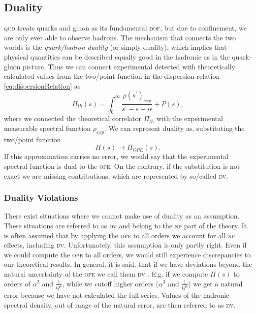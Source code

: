 \documentclass[../../index.tex]{subfiles}
\begin{document}
\subsection{Duality}
\label{sec:duality}
\textsc{qcd} treats quarks and gluon as its fundamental \textsc{dof}, but due to
confinement, we are only ever able to observe hadrons. The mechanism that
connects the two worlds is the \textit{quark\-/hadron duality} (or simply
duality), which implies that physical quantities can be described equally good
in the hadronic as in the quark-gluon picture. Thus we can connect experimental
detected with theoretically calculated values from the two\-/point function in
the dispersion relation \cref{eq:dispersionRelation} as
\begin{equation}
  \Pi_{th}(s) = \int_0^\infty \frac{\rho(s^\prime)_{exp}}{s^\prime-s-i\epsilon} + P(s),
\end{equation}
where we connected the theoretical correlator \(\Pi_{th}\) with the experimental
measurable spectral function \(\rho_{exp}\). We can represent duality as,
substituting the two\-/point function \cite{Cata2005}
\begin{equation}
  \Pi(s) \to \Pi_{OPE}(s).
\end{equation}
If this approximation carries no error, we would say that the experimental
spectral function is dual to the \textsc{ope}. On the contrary, if the
substitution is not exact we are missing contributions, which are represented by
so\-/called \textsc{dv}.


\subsubsection{Duality Violations}
There exist situations where we cannot make use of duality as an assumption.
These situations are referred to as \textsc{dv} and belong to the \textsc{np}
part of the theory. It is often assumed that by applying the \textsc{ope} to all
orders we account for all \textsc{np} effects, including \textsc{dv}.
Unfortunately, this assumption is only partly right. Even if we could compute the
\textsc{ope} to all orders, we would still experience discrepancies to our
theoretical results. In general, it is said, that if we have deviations beyond
the natural uncertainty of the \textsc{ope} we call them \textsc{dv}
\cite{Shifman2000}. E.g. if we compute \(\Pi(s)\) to orders of \(\alpha^2\) and
\(\frac{1}{Q^4}\), while we cutoff higher orders (\(\alpha^3\) and
\(\frac{1}{Q^6}\)) we get a natural error because we have not calculated the
full series. Values of the hadronic spectral density, out of range of the
natural error, are then referred to as \textsc{dv}.
\end{document}
